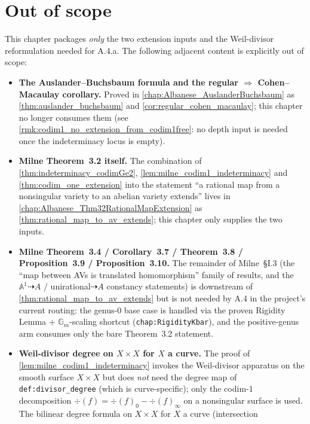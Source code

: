 \section{Out of scope}
\label{sec:codim1_out_of_scope}

This chapter packages \emph{only} the two extension inputs and the Weil-divisor
reformulation needed for A.4.a. The following adjacent content is explicitly out of
scope:
\begin{itemize}
  \item \textbf{The Auslander--Buchsbaum formula and the regular \(\Rightarrow\)
    Cohen--Macaulay corollary.} Proved in \cref{chap:Albanese_AuslanderBuchsbaum}
    as \cref{thm:auslander_buchsbaum} and \cref{cor:regular_cohen_macaulay}; this
    chapter no longer consumes them (see
    \cref{rmk:codim1_no_extension_from_codim1free}: no depth input is needed once
    the indeterminacy locus is empty).
  \item \textbf{Milne Theorem~3.2 itself.} The combination of
    \cref{thm:indeterminacy_codimGe2}, \cref{lem:milne_codim1_indeterminacy} and
    \cref{thm:codim_one_extension} into the
    statement ``a rational map from a nonsingular variety to an abelian variety
    extends'' lives in \cref{chap:Albanese_Thm32RationalMapExtension} as
    \cref{thm:rational_map_to_av_extends}; this chapter only supplies the two inputs.
  \item \textbf{Milne Theorem~3.4 / Corollary~3.7 / Theorem~3.8 / Proposition~3.9 /
    Proposition~3.10.} The remainder of Milne~\S I.3 (the ``map between AVs is
    translated homomorphism'' family of results, and the
    \(\mathbb A^1 \dashrightarrow A\) / unirational\(\dashrightarrow A\) constancy
    statements) is downstream of \cref{thm:rational_map_to_av_extends} but is not
    needed by A.4 in the project's current routing: the genus-\(0\) base case is
    handled via the proven Rigidity Lemma + \(\mathbb G_m\)-scaling shortcut
    (\texttt{chap:RigidityKbar}), and the positive-genus arm consumes only the bare
    Theorem~3.2 statement.
  \item \textbf{Weil-divisor degree on \(X \times X\) for \(X\) a curve.} The proof of
    \cref{lem:milne_codim1_indeterminacy} invokes the Weil-divisor apparatus on the
    smooth surface \(X \times X\) but does \emph{not} need the degree map of
    \texttt{def:divisor_degree} (which is curve-specific); only the codim-\(1\)
    decomposition \(\div(f) = \div(f)_0 - \div(f)_\infty\) on a nonsingular surface is
    used. The bilinear degree formula on \(X \times X\) for \(X\) a curve (intersection

\end{itemize}
